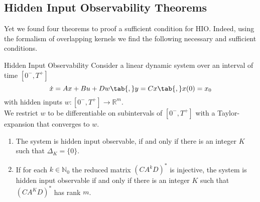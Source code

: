 \clearpage
\subsection{Hidden Input Observability Theorems}
Yet we found four theorems to proof a sufficient condition for HIO. Indeed, using the 
formalism of overlapping kernels we find the following necessary and sufficient conditions.
\begin{theorem}{Hidden Input Observability}{}
	Consider a linear dynamic system over an interval of time $[0^-,T^+]$
	\begin{equation*}
	\dot{x} = Ax + Bu + Dw  \tab{,}
	y=Cx \tab{,}
	x(0) = x_0 
	\end{equation*}
	with hidden inputs $w:[0^-,T^+]\to \mathbb{R}^m$. \\
	We restrict $w$ to be differentiable on subintervals of $[0^-,T^+]$ with a 
	Taylor-expansion that converges to $w$. 
	\begin{enumerate}
	\item
	The system is hidden input observable, if and only if there is an integer $K$ such that 
	$\Delta_K=\{0\}$.
	\item
	If for each $k\in\mathbb{N}_0$ the reduced matrix $(CA^kD)^*$ is injective,
	the system is hidden input observable if and only if
	there is an integer $K$ such that $(CA^KD)^*$ has rank $m$. 
	\end{enumerate}
\end{theorem}
